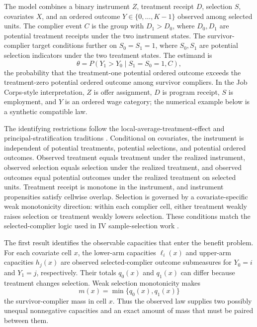 \documentclass[11pt]{article}
\begin{document}
The model combines a binary instrument \(Z\), treatment receipt \(D\), selection \(S\), covariates \(X\), and an ordered outcome \(Y\in\{0,\ldots,K-1\}\) observed among selected units.  The complier event \(C\) is the group with \(D_1>D_0\), where \(D_0,D_1\) are potential treatment receipts under the two instrument states.  The survivor-complier target conditions further on \(S_0=S_1=1\), where \(S_0,S_1\) are potential selection indicators under the two treatment states.  The estimand is
\[
\theta
=
P(Y_1>Y_0\mid S_1=S_0=1,C),
\]
the probability that the treatment-one potential ordered outcome exceeds the treatment-zero potential ordered outcome among survivor compliers.  In the Job Corps-style interpretation, \(Z\) is offer assignment, \(D\) is program receipt, \(S\) is employment, and \(Y\) is an ordered wage category; the numerical example below is a synthetic compatible law.

The identifying restrictions follow the local-average-treatment-effect and principal-stratification traditions \citep{ImbensAngrist1994,AngristImbensRubin1996,FrangakisRubin2002}.  Conditional on covariates, the instrument is independent of potential treatments, potential selections, and potential ordered outcomes.  Observed treatment equals treatment under the realized instrument, observed selection equals selection under the realized treatment, and observed outcomes equal potential outcomes under the realized treatment on selected units.  Treatment receipt is monotone in the instrument, and instrument propensities satisfy cellwise overlap.  Selection is governed by a covariate-specific weak monotonicity direction: within each complier cell, either treatment weakly raises selection or treatment weakly lowers selection.  These conditions match the selected-complier logic used in IV sample-selection work \citep{ChenFlores2015,KennedyHarrisKeele2019,DongHeiler2026}.

The first result identifies the observable capacities that enter the benefit problem.  For each covariate cell \(x\), the lower-arm capacities \(\ell_i(x)\) and upper-arm capacities \(h_j(x)\) are observed selected-complier outcome submeasures for \(Y_0=i\) and \(Y_1=j\), respectively.  Their totals \(q_0(x)\) and \(q_1(x)\) can differ because treatment changes selection.  Weak selection monotonicity makes
\[
m(x)=\min\{q_0(x),q_1(x)\}
\]
the survivor-complier mass in cell \(x\).  Thus the observed law supplies two possibly unequal nonnegative capacities and an exact amount of mass that must be paired between them.
\end{document}
